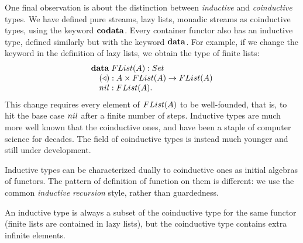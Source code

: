 One final observation is about the distinction between {\em inductive} and {\em coinductive} types.
We have defined pure streams, lazy lists, monadic streams as coinductive types, using the keyword $\mathbf{codata}$.
Every container functor also has an inductive type, defined similarly but with the keyword $\mathbf{data}$.
For example, if we change the keyword in the definition of lazy lists, we obtain the type of finite lists:
$$
\begin{array}[t]{l}
\data\;
\flst{A}:\set\\
\quad (\scons): A\times \flst{A}\rightarrow\flst{A}\\
\quad \nil: \flst{A}.
\end{array}
$$
This change requires every element of $\flst{A}$ to be well-founded, that is, to hit the base case $\nil$ after a finite number of steps.
Inductive types are much more well known that the coinductive ones, and have been a staple of computer science for decades.
The field of coinductive types is instead much younger and still under development.

Inductive types can be characterized dually to coinductive ones as initial algebras of functors.
The pattern of definition of function on them is different: we use the common {\em inductive recursion} style, rather than guardedness.

An inductive type is always a subset of the coinductive type for the same functor (finite lists are contained in lazy lists), but the coinductive type contains extra infinite elements.

